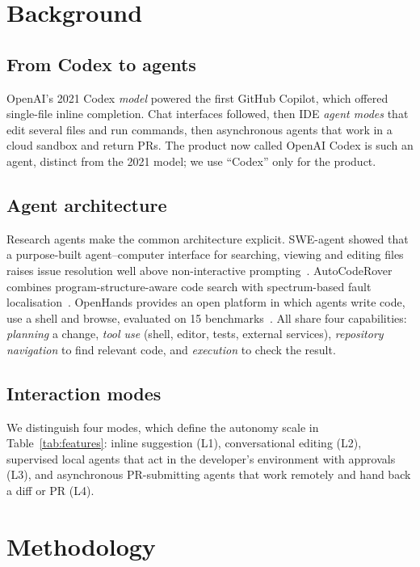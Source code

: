 \documentclass[conference]{IEEEtran}
\begin{document}
\section{Background}

\subsection{From Codex to agents}
OpenAI's 2021 Codex \emph{model} powered the first GitHub Copilot, which offered single-file inline
completion. Chat interfaces followed, then IDE \emph{agent modes} that edit several files and run
commands, then asynchronous agents that work in a cloud sandbox and return PRs. The product now called
OpenAI Codex is such an agent, distinct from the 2021 model; we use ``Codex'' only for the product.

\subsection{Agent architecture}
Research agents make the common architecture explicit. SWE-agent showed that a purpose-built
agent--computer interface for searching, viewing and editing files raises issue resolution well above
non-interactive prompting~\cite{yang2024sweagent}. AutoCodeRover combines program-structure-aware code
search with spectrum-based fault localisation~\cite{zhang2024autocoderover}. OpenHands provides an open
platform in which agents write code, use a shell and browse, evaluated on 15 benchmarks~\cite{wang2025openhands}.
All share four capabilities: \emph{planning} a change, \emph{tool use} (shell, editor, tests, external
services), \emph{repository navigation} to find relevant code, and \emph{execution} to check the result.

\subsection{Interaction modes}
We distinguish four modes, which define the autonomy scale in Table~\ref{tab:features}: inline
suggestion (L1), conversational editing (L2), supervised local agents that act in the developer's
environment with approvals (L3), and asynchronous PR-submitting agents that work remotely and hand back a
diff or PR (L4).

\section{Methodology}
\end{document}
